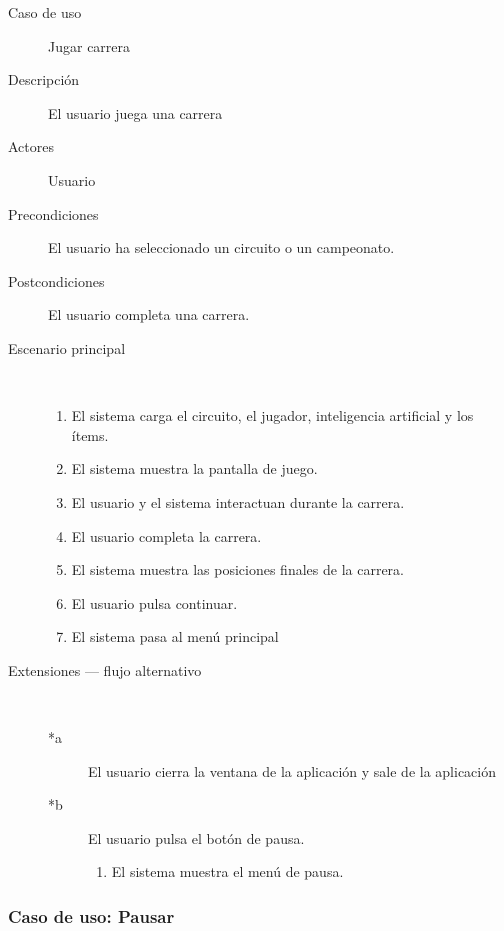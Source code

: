 \begin{description}
    \item[Caso de uso] Jugar carrera
    \item[Descripción] El usuario juega una carrera
    \item[Actores] Usuario
    \item[Precondiciones] El usuario ha seleccionado un circuito o un campeonato.
    \item[Postcondiciones] El usuario completa una carrera.
    \item[Escenario principal] $\quad$
        \begin{enumerate}
            \item El sistema carga el circuito, el jugador, inteligencia artificial y los ítems.
            \item El sistema muestra la pantalla de juego.
            \item El usuario y el sistema interactuan durante la carrera.
            \item El usuario completa la carrera.
            \item El sistema muestra las posiciones finales de la carrera.
            \item El usuario pulsa continuar.
            \item El sistema pasa al menú principal
        \end{enumerate}
    \item[Extensiones --- flujo alternativo] $\quad$
        \begin{description}
            \item[*a ] El usuario cierra la ventana de la aplicación y sale de la aplicación
            \item[*b] El usuario pulsa el botón de pausa.
                \begin{enumerate}
                    \item El sistema muestra el menú de pausa.
                \end{enumerate}
            
        \end{description}
\end{description}

\subsubsection{Caso de uso: Pausar}

